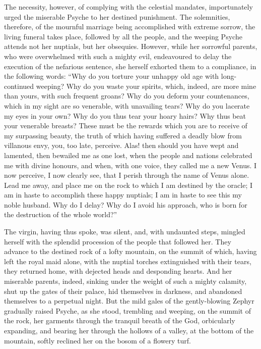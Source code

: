 \documentclass{article}
\begin{document}
The necessity, however, of complying with the celestial mandates, importunately
urged the miserable Psyche to her destined punishment. The solemnities,
therefore, of the mournful marriage being accomplished with extreme sorrow, the
living funeral takes place, followed by all the people, and the weeping Psyche
attends not her nuptials, but her obsequies. However, while her sorrowful
parents, who were overwhelmed with such a mighty evil, endeavoured to delay the
execution of the nefarious sentence, she herself exhorted them to a compliance,
in the following words: ``Why do you torture your unhappy old age with
long-continued weeping? Why do you waste your spirits, which, indeed, are more
mine than yours, with such frequent groans? Why do you deform your
countenances, which in my sight are so venerable, with unavailing tears? Why do
you lacerate my eyes in your own? Why do you thus tear your hoary hairs? Why
thus beat your venerable breasts? These must be the rewards which you are to
receive of my surpassing beauty, the truth of which having suffered a deadly
blow from villanous envy, you, too late, perceive. Alas! then should you have
wept and lamented, then bewailed me as one lost, when the people and nations
celebrated me with divine honours, and when, with one voice, they called me a
new Venus. I now perceive, I now clearly see, that I perish through the name of
Venus alone. Lead me away, and place me on the rock to which I am destined by
the oracle; I am in haste to accomplish these happy nuptials; I am in haste to
see this my noble husband. Why do I delay? Why do I avoid his approach, who is
born for the destruction of the whole world?''

The virgin, having thus spoke, was silent, and, with undaunted steps, mingled
herself with the splendid procession of the people that followed her. They
advance to the destined rock of a lofty mountain, on the summit of which,
having left the royal maid alone, with the nuptial torches extinguished with
their tears, they returned home, with dejected heads and desponding hearts. And
her miserable parents, indeed, sinking under the weight of such a mighty
calamity, shut up the gates of their palace, hid themselves in darkness, and
abandoned themselves to a perpetual night. But the mild gales of the
gently-blowing Zephyr gradually raised Psyche, as she stood, trembling and
weeping, on the summit of the rock, her garments through the tranquil breath of
the God, orbicularly expanding, and bearing her through the hollows of a
valley, at the bottom of the mountain, softly reclined her on the bosom of a
flowery turf.
\end{document}
